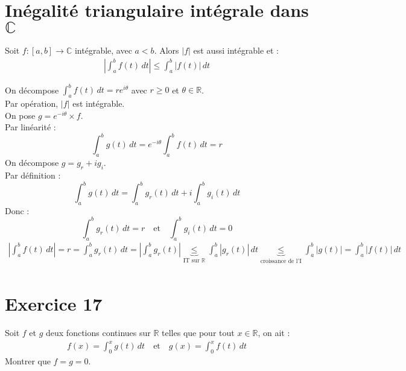 \documentclass[../main.tex]{subfiles}
\begin{document}
\section{Inégalité triangulaire intégrale dans $\mathbb{C}$}
\begin{tcolorbox}[title=Théorème 26.75, title filled=false, colframe=orange, colback=orange!10!white]
    Soit $f:[a, b]\to \mathbb{C}$ intégrable, avec $a < b$. Alors $|f|$ est aussi intégrable et : 
    \begin{align*}
        \left| \int_{a}^{b} f(t) \,dt \right| \leq \int_{a}^{b} |f(t)| \,dt
    \end{align*}
\end{tcolorbox}

On décompose $\int_{a}^{b} f(t) \,dt = re^{i\theta}$ avec $r\geq 0$ et $\theta\in \mathbb{R}$. \\
Par opération, $|f|$ est intégrable. \\
On pose $g = e^{-i\theta} \times f$. \\
Par linéarité : $$\int_{a}^{b} g(t) \,dt = e^{-i\theta} \int_{a}^{b} f(t) \,dt = r$$
On décompose $g = g_r + ig_i$. \\
Par définition : $$\int_{a}^{b} g(t) \,dt = \int_{a}^{b} g_r(t) \,dt + i \int_{a}^{b} g_i(t) \,dt$$
Donc : $$\int_{a}^{b} g_r(t) \,dt = r \quad \text{et} \quad \int_{a}^{b} g_i(t) \,dt = 0$$
\begin{align*}
    \left| \int_{a}^{b} f(t) \,dt \right| = r = \int_{a}^{b} g_r(t) \,dt = \left| \int_{a}^{b} g_r(t) \right| \underbrace{\leq}_{\text{IT sur $\mathbb{R}$}} \int_{a}^{b} |g_r(t)| \,dt \underbrace{\leq}_{\text{croissance de l'I}} \int_{a}^{b} |g(t)| = \int_{a}^{b} |f(t)| \,dt \\ 
\end{align*}

\section*{Exercice 17}
\begin{tcolorbox}[title=Exercice 26.17, title filled=false, colframe=darkgreen, colback=darkgreen!10!white]
    Soit $f$ et $g$ deux fonctions continues sur $\mathbb{R}$ telles que pour tout $x\in \mathbb{R}$, on ait : 
    \begin{align*}
        f(x) = \int_{0}^{x} g(t) \,dt \quad \text{et} \quad g(x) = \int_{0}^{x} f(t) \,dt
    \end{align*}
    Montrer que $f = g = 0$.
\end{tcolorbox}
\end{document}
